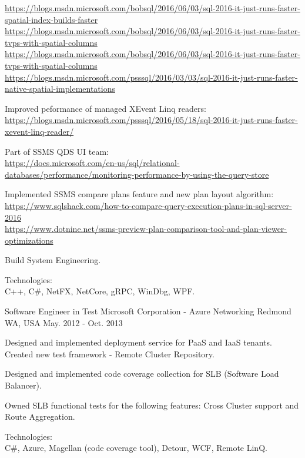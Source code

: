 \begin{cventries}
{\begin{cvitems}
{      \scriptsize
      \url{https://blogs.msdn.microsoft.com/bobsql/2016/06/03/sql-2016-it-just-runs-faster-spatial-index-builds-faster} \\
      \url{https://blogs.msdn.microsoft.com/bobsql/2016/06/03/sql-2016-it-just-runs-faster-tvps-with-spatial-columns} \\
      \url{https://blogs.msdn.microsoft.com/bobsql/2016/06/03/sql-2016-it-just-runs-faster-tvps-with-spatial-columns} \\
      \url{https://blogs.msdn.microsoft.com/psssql/2016/03/03/sql-2016-it-just-runs-faster-native-spatial-implementations}
      }
    \item
    {
      Improved peformance of managed XEvent Linq readers: \\
      \scriptsize
      \url {https://blogs.msdn.microsoft.com/psssql/2016/05/18/sql-2016-it-just-runs-faster-xevent-linq-reader/}
    }
    \item
    { 
      Part of SSMS QDS UI team: \\
      \scriptsize
      \url {https://docs.microsoft.com/en-us/sql/relational-databases/performance/monitoring-performance-by-using-the-query-store}
    }
    \item
    {
      Implemented SSMS compare plans feature and new plan layout algorithm: \\
      \scriptsize
      \url {https://www.sqlshack.com/how-to-compare-query-execution-plans-in-sql-server-2016} \\
      \url {https://www.dotnine.net/ssms-preview-plan-comparison-tool-and-plan-viewer-optimizations}
    }
    \item
    {
      Build System Engineering.
    }
    \item
    {
      Technologies: \\
      C++, {C\#}, NetFX, NetCore, gRPC, WinDbg, WPF.
    }
  \end{cvitems}
}

\cventry
{Software Engineer in Test} %
{Microsoft Corporation - Azure Networking} %
{Redmond WA, USA} %
{May. 2012 - Oct. 2013} %
{
  \begin{cvitems} %
    \item
    {
      Designed and implemented deployment service for PaaS and IaaS tenants. 
      Created new test framework - Remote Cluster Repository.
    }
    \item
    {
      Designed and implemented code coverage collection for SLB (Software Load Balancer).
    }
    \item
    {
      Owned SLB functional tests for the following features:
      Cross Cluster support and Route Aggregation.
    }
    \item
    {
      Technologies: \\
      {C\#}, Azure, Magellan (code coverage tool), Detour, WCF, Remote LinQ.
    }
  \end{cvitems}
}


\end{cventries}
